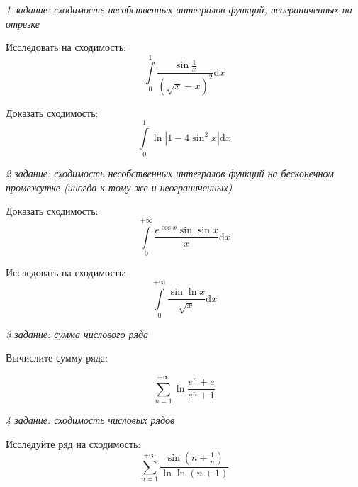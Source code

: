 \documentclass[russian]{article}
\newcommand{\dx}{\text{d}x}
\begin{document}
\textit{1 задание: сходимость несобственных интегралов функций, неограниченных на отрезке}

Исследовать на сходимость:
$$\int\limits_0^1 \frac{\sin \frac{1}{x}}{(\sqrt{x} - x)^2}\dx$$

Доказать сходимость:
$$\int\limits_0^1 \ln | 1 - 4 \sin^2 x| \dx$$

\textit{2 задание: сходимость несобственных интегралов функций на бесконечном промежутке (иногда к тому же и неограниченных)}

Доказать сходимость:
$$\int\limits_0^{+\infty} \frac{e^{\cos x} \sin \sin x}{x} \dx$$

Исследовать на сходимость:
$$\int\limits_0^{+\infty} \frac{\sin \ln x}{\sqrt{x}} \dx$$

\textit{3 задание: сумма числового ряда}

Вычислите сумму ряда:

$$\sum\limits_{n = 1}^{+\infty} \ln \frac{e^n + e}{e^n + 1}$$

\textit{4 задание: сходимость числовых рядов}

Исследуйте ряд на сходимость:
$$\sum\limits_{n = 1}^{+\infty} \frac{\sin(n + \frac{1}{n})}{\ln \ln (n + 1)}$$
\end{document}
